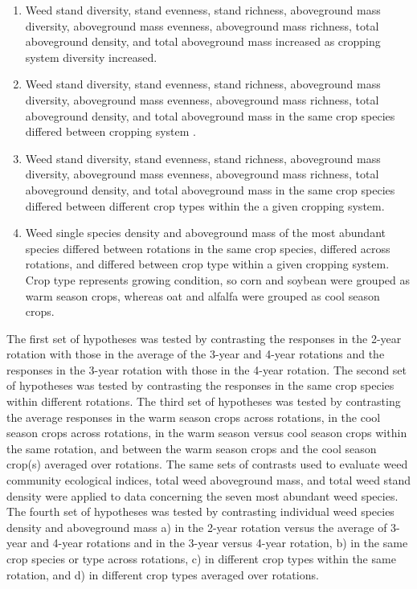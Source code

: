 \documentclass[
]{article}
\begin{document}
\begin{enumerate}
\def\labelenumi{\arabic{enumi})}
\item
  Weed stand diversity, stand evenness, stand richness, aboveground mass diversity, aboveground mass evenness, aboveground mass richness, total aboveground density, and total aboveground mass increased as cropping system diversity increased.
\item
  Weed stand diversity, stand evenness, stand richness, aboveground mass diversity, aboveground mass evenness, aboveground mass richness, total aboveground density, and total aboveground mass in the same crop species differed between cropping system .
\item
  Weed stand diversity, stand evenness, stand richness, aboveground mass diversity, aboveground mass evenness, aboveground mass richness, total aboveground density, and total aboveground mass in the same crop species differed between different crop types within the a given cropping system.
\item
  Weed single species density and aboveground mass of the most abundant species differed between rotations in the same crop species, differed across rotations, and differed between crop type within a given cropping system. Crop type represents growing condition, so corn and soybean were grouped as warm season crops, whereas oat and alfalfa were grouped as cool season crops.
\end{enumerate}

The first set of hypotheses was tested by contrasting the responses in the 2-year rotation with those in the average of the 3-year and 4-year rotations and the responses in the 3-year rotation with those in the 4-year rotation. The second set of hypotheses was tested by contrasting the responses in the same crop species within different rotations. The third set of hypotheses was tested by contrasting the average responses in the warm season crops across rotations, in the cool season crops across rotations, in the warm season versus cool season crops within the same rotation, and between the warm season crops and the cool season crop(s) averaged over rotations. The same sets of contrasts used to evaluate weed community ecological indices, total weed aboveground mass, and total weed stand density were applied to data concerning the seven most abundant weed species. The fourth set of hypotheses was tested by contrasting individual weed species density and aboveground mass a) in the 2-year rotation versus the average of 3-year and 4-year rotations and in the 3-year versus 4-year rotation, b) in the same crop species or type across rotations, c) in different crop types within the same rotation, and d) in different crop types averaged over rotations.
\end{document}
